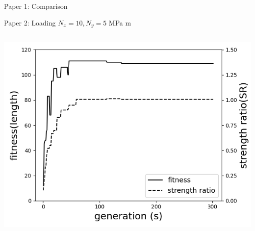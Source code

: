 \documentclass{beamer}
\begin{document}
\begin{frame}{Paper 1: Comparison}
	
\end{frame}



\begin{frame}{Paper 2: Loading $N_x = 10, N_y=5 $ MPa m}
    \begin{columns}
    \begin{column}{0.5\textwidth}

        \begin{center}
			\includegraphics[width=1.0\linewidth]{./fig/two_distinct_angle_fitness_and_sr.png}
        \end{center}


\end{column}
\end{columns}
\end{frame}
\end{document}
